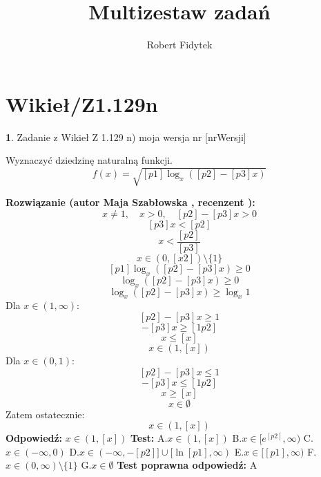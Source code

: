 \documentclass[12pt, a4paper]{article}
\title{Multizestaw zadań}
\author{Robert Fidytek}
\date{}
\theoremstyle{definition} %
\newtheorem{zad}{}
\newcommand{\kategoria}[1]{\section{#1}} %
\newcommand{\zadStart}[1]{\begin{zad}#1\newline} %
\newcommand{\zadStop}{\end{zad}}   %
\newcommand{\rozwStart}[2]{\noindent \textbf{Rozwiązanie (autor #1 , recenzent #2): }\newline} %
\newcommand{\rozwStop}{\newline}                                            %
\newcommand{\odpStart}{\noindent \textbf{Odpowiedź:}\newline}    %
\newcommand{\odpStop}{\newline}                                             %
\newcommand{\testStart}{\noindent \textbf{Test:}\newline} %
\newcommand{\testStop}{\newline} %
\newcommand{\kluczStart}{\noindent \textbf{Test poprawna odpowiedź:}\newline} %
\newcommand{\kluczStop}{\newline} %
\begin{document}
\maketitle


\kategoria{Wikieł/Z1.129n}
\zadStart{Zadanie z Wikieł Z 1.129 n) moja wersja nr [nrWersji]}

Wyznaczyć dziedzinę naturalną funkcji.
$$f(x)=\sqrt{[p1]\log_{x}([p2]-[p3]x)}$$
\zadStop

\rozwStart{Maja Szabłowska}{}
$$x\neq1, \quad x>0, \quad [p2]-[p3]x>0 $$
$$[p3]x<[p2]$$
$$x<\frac{[p2]}{[p3]}$$
$$x\in\left(0,[x2]\right)\setminus\{1\}$$
$$[p1]\log_{x}([p2]-[p3]x)\geq0$$
$$\log_{x}([p2]-[p3]x)\geq0$$
$$\log_{x}([p2]-[p3]x)\geq \log_{x}1$$
Dla $x\in(1,\infty)$:
$$[p2]-[p3]x\geq1$$
$$-[p3]x\geq[1p2]$$
$$x\leq[x]$$
$$x\in(1,[x])$$
Dla $x\in(0,1):$
$$[p2]-[p3]x\leq1$$
$$-[p3]x\leq[1p2]$$
$$x\geq[x]$$
$$x\in\emptyset$$
Zatem ostatecznie:
$$x\in(1,[x])$$
\rozwStop
\odpStart
$x\in(1,[x])$
\odpStop
\testStart
A.$x\in(1,[x])$
B.$x\in[e^{[p2]},\infty)$
C.$x\in(-\infty, 0)$
D.$x\in(-\infty, -[p2]] \cup [\ln[p1],\infty)$
E.$x\in[[p1],\infty)$
F.$x\in(0,\infty)\setminus\{1\}$
G.$x\in\emptyset$
\testStop
\kluczStart
A
\kluczStop
\end{document}
